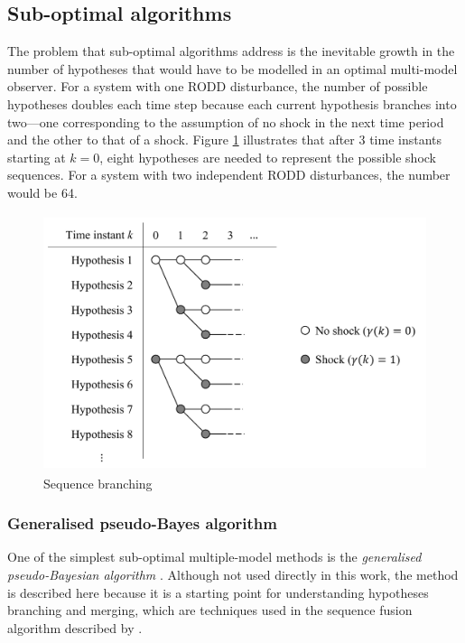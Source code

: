 \subsection{Sub-optimal algorithms} \label{sec:sub-opt}

The problem that sub-optimal algorithms address is the inevitable growth in the number of hypotheses that would have to be modelled in an optimal multi-model observer. For a system with one \gls{RODD} disturbance, the number of possible hypotheses doubles each time step because each current hypothesis branches into two—one corresponding to the assumption of no shock in the next time period and the other to that of a shock. Figure \ref{fig:mm-obs-br} illustrates that after 3 time instants starting at $k=0$, eight hypotheses are needed to represent the possible shock sequences. For a system with two independent \gls{RODD} disturbances, the number would be 64.

\begin{figure}[ht]
	\centering
	\includegraphics[height=7.5cm]{images/mm_obs_seq_br.pdf}
	\caption{Sequence branching}
	\label{fig:mm-obs-br}
\end{figure}

\subsubsection{Generalised pseudo-Bayes algorithm} \label{sec:GPB}

One of the simplest sub-optimal multiple-model methods is the \textit{generalised pseudo-Bayesian algorithm} \citep{buxbaum_recursive_1969, jaffer_estimation_1971, tugnait_detection_1982}. Although not used directly in this work, the method is described here because it is a starting point for understanding hypotheses branching and merging, which are techniques used in the sequence fusion algorithm described by \cite{robertson_detection_1995}.

